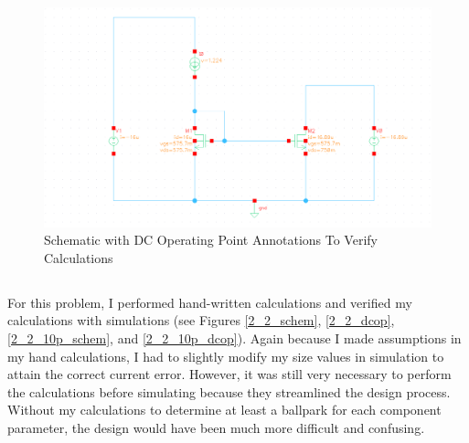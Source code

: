 \documentclass{article}
\begin{document}
\begin{figure}[H]
\centering
\includegraphics[width=6in]{p2_1_dcop.png}
\caption{Schematic with DC Operating Point Annotations To Verify Calculations}
\label{2_1_dcop}
\end{figure}
\newpage

\subsection{}
For this problem, I performed hand-written calculations and verified my calculations with simulations (see Figures \ref{2_2_schem}, \ref{2_2_dcop}, \ref{2_2_10p_schem}, and \ref{2_2_10p_dcop}). Again because I made assumptions in my hand calculations, I had to slightly modify my size values in simulation to attain the correct current error. However, it was still very necessary to perform the calculations before simulating because they streamlined the design process. Without my calculations to determine at least a ballpark for each component parameter, the design would have been much more difficult and confusing.
\end{document}
